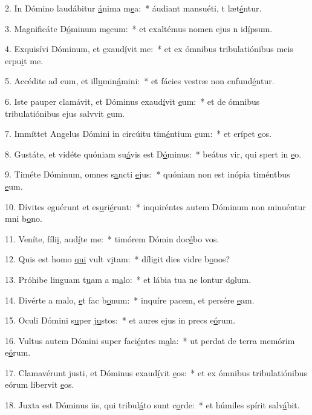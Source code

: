 2. In Dómino laudábitur \uline{á}nima m\uline{e}a:~* áudiant mansuéti, t læt\uline{é}ntur.\par 
3. Magnificáte D\uline{ó}minum m\uline{e}cum:~* et exaltémus nomen ejus n id\uline{í}psum.\par 
4. Exquisívi Dóminum, et \uline{e}xaud\uline{í}vit me:~* et ex ómnibus tribulatiónibus meis erpu\uline{i}t me.\par 
5. Accédite ad eum, et ill\uline{u}min\uline{á}mini:~* et fácies vestræ non cnfund\uline{é}ntur.\par 
6. Iste pauper clamávit, et Dóminus exaud\uline{í}vit \uline{e}um:~* et de ómnibus tribulatiónibus ejus salvvit \uline{e}um.\par 
7. Immíttet Angelus Dómini in circúitu tim\uline{é}ntium \uline{e}um:~* et erípet \uline{e}os.\par 
8. Gustáte, et vidéte quóniam su\uline{á}vis est D\uline{ó}minus:~* beátus vir, qui spert in \uline{e}o.\par 
9. Timéte Dóminum, omnes s\uline{a}ncti \uline{e}jus:~* quóniam non est inópia timéntbus \uline{e}um.\par 
10. Dívites eguérunt et es\uline{u}ri\uline{é}runt:~* inquiréntes autem Dóminum non minuéntur mni b\uline{o}no.\par 
11. Veníte, fíli\uline{i}, aud\uline{í}te me:~* timórem Dómin doc\uline{é}bo vos.\par 
12. Quis est homo \uline{qui} vult v\uline{i}tam:~* díligit dies vidre b\uline{o}nos?\par 
13. Próhibe linguam t\uline{u}am a m\uline{a}lo:~* et lábia tua ne lontur d\uline{o}lum.\par 
14. Divérte a malo, \uline{e}t fac b\uline{o}num:~* inquíre pacem, et persére \uline{e}am.\par 
15. Oculi Dómini s\uline{u}per j\uline{u}stos:~* et aures ejus in precs e\uline{ó}rum.\par 
16. Vultus autem Dómini super faci\uline{é}ntes m\uline{a}la:~* ut perdat de terra memórim e\uline{ó}rum.\par 
17. Clamavérunt justi, et Dóminus exaud\uline{í}vit \uline{e}os:~* et ex ómnibus tribulatiónibus eórum libervit \uline{e}os.\par 
18. Juxta est Dóminus iis, qui tribul\uline{á}to sunt c\uline{o}rde:~* et húmiles spírit salv\uline{á}bit.\par 
